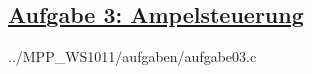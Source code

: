 \subsection*{
\href{http://cst.mi.fu-berlin.de/intern/19606-P-MPP/Aufgaben/040103.html}
{Aufgabe 3: Ampelsteuerung}}


{../MPP_WS1011/aufgaben/aufgabe03.c}

